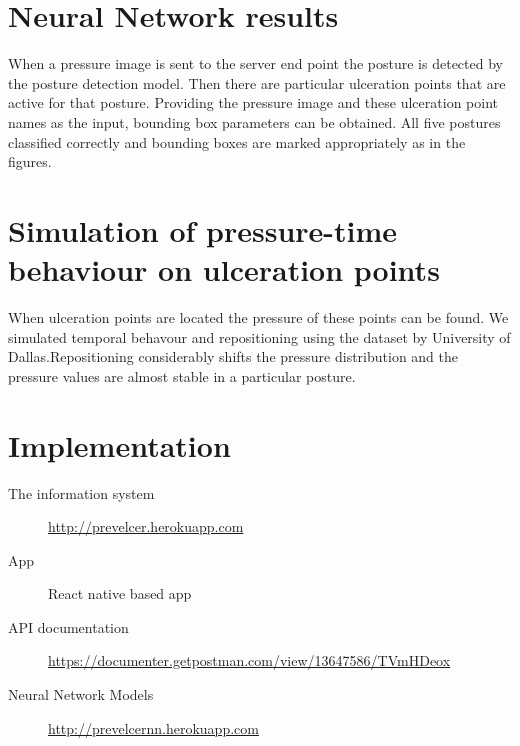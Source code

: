 \section{Neural Network results}
When a pressure image is sent to the server end point the posture is detected by the posture detection model. Then there are particular ulceration points that are active for that posture. Providing the pressure image and these ulceration point names as the input, bounding box parameters can be obtained.
All five postures classified correctly and bounding boxes are marked appropriately as in the figures.

\section{Simulation of pressure-time behaviour on ulceration points}

When ulceration points are located the pressure of these points can be found. We simulated temporal behavour and repositioning using the dataset by University of Dallas.Repositioning considerably shifts the pressure distribution and the pressure values are almost stable in a particular posture.



\section{Implementation}

\begin{description}
    \item[The information system]   \url{http://prevelcer.herokuapp.com}
    \item[App] React native based app
    \item[API documentation] \url{https://documenter.getpostman.com/view/13647586/TVmHDeox}
    \item[Neural Network Models] \url{http://prevelcernn.herokuapp.com}
\end{description}




